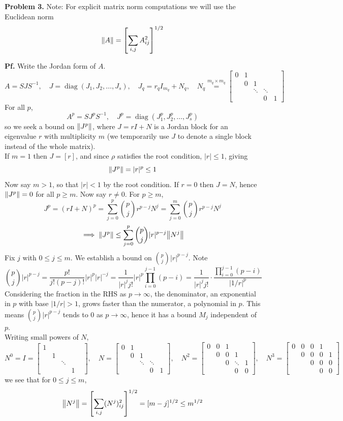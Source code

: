 \documentclass{article}
\def\tbf#1{\textbf{#1}}
\newcommand{\sbr}[1]{\left[#1\right]}
\newcommand{\m}[2][b]{\begin{#1matrix}#2\end{#1matrix}}
\newcommand{\inv}{^{-1}}
\newcommand{\pf}{\tbf{Pf. }}
\newcommand{\imp}{\implies}
\DeclareMathOperator{\diag}{diag}
\begin{document}
\tbf{Problem 3.} Note: For explicit matrix norm computations we will use the Euclidean norm
$$\norm{A} = \sbr{\sum_{i,j}A_{ij}^2}^{1/2}$$

\pf Write the Jordan form of $A$.
$$A = SJS\inv,
\quad J = \diag(J_1,J_2,\dots,J_s),
\quad J_q = r_qI_{m_q} + N_q,
\quad N_q \overset{m_q\times m_q}{=} \m{
0 & 1 & & \\
& 0 & 1 & & \\
& & \ddots & \ddots \\
& & & 0 & 1
}$$
For all $p$,
$$A^p = SJ^pS\inv,
\quad J^p = \diag(J_1^p,J_2^p,\dots,J_s^p)$$
so we seek a bound on $\norm{J^p}$, where $J=rI+N$ is a Jordan block for an eigenvalue $r$ with multiplicity $m$ (we temporarily use $J$ to denote a single block instead of the whole matrix).\\

If $m=1$ then $J=[r]$, and since $\rho$ satisfies the root condition, $|r|\le 1$, giving
$$\norm{J^p} = |r|^p \le 1$$
Now say $m>1$, so that $|r|<1$ by the root condition. If $r=0$ then $J=N$, hence $\norm{J^p}=0$ for all $p\ge m$. Now say $r\ne 0$. For $p\ge m$,
$$J^p = (rI+N)^p = \sum_{j=0}^p \binom{p}{j}r^{p-j}N^j = \sum_{j=0}^m \binom{p}{j}r^{p-j}N^j$$
$$\imp \norm{J^p} \le \sum_{j=0}^p \binom{p}{j}|r|^{p-j}\norm{N^j}$$
Fix $j$ with $0\le j\le m$. We establish a bound on $\binom{p}{j}|r|^{p-j}$. Note
$$\binom{p}{j}|r|^{p-j} = \frac{p!}{j!(p-j)!}|r|^p|r|^{-j}
= \frac{1}{|r|^jj!}|r|^p \prod_{i=0}^{j-1}(p-i)
= \frac{1}{|r|^jj!} \cdot \frac{\prod_{i=0}^{j-1}(p-i)}{|1/r|^p}$$
Considering the fraction in the RHS as $p\to\infty$, the denominator, an exponential in $p$ with base $|1/r|>1$, grows faster than the numerator, a polynomial in $p$. This means $\binom{p}{j}|r|^{p-j}$ tends to 0 as $p\to\infty$, hence it has a bound $M_j$ independent of $p$.\\

Writing small powers of $N$,
$$N^0 = I = \m{
	1 &  & & \\
	& 1 &  & & \\
	& & \ddots &  \\
	& & & 1 & 
},
\quad N = \m{
	0 & 1 & & \\
	& 0 & 1 & & \\
	& & \ddots & \ddots \\
	& & & 0 & 1
},
\quad N^2 = \m{
	0 & 0 & 1 & \\
	& 0 & 0 & 1 & \\
	& & 0 & \ddots & 1 \\
	& & & 0 & 0
},
\quad N^3 = \m{
	0 & 0 & 0 & 1 \\
	& 0 & 0 & 0 & 1 \\
	& & 0 & 0 & 0 \\
	& & & 0 & 0
}
$$
we see that for $0\le j\le m$,
$$\norm{N^j} = \sbr{\sum_{i,j}(N^j)_{ij}^2}^{1/2} = [m-j]^{1/2} \le m^{1/2}$$
\end{document}
